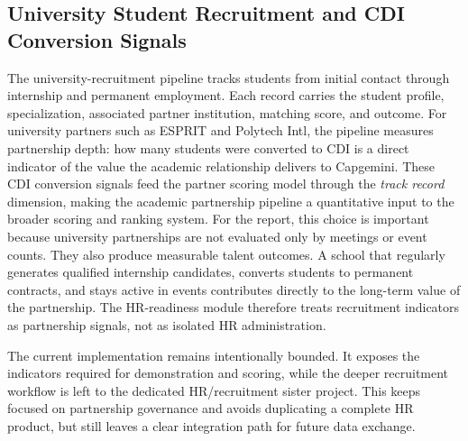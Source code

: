 \subsection{University Student Recruitment and CDI Conversion Signals}

The university-recruitment pipeline tracks students from initial contact through internship and permanent employment. Each record carries the student profile, specialization, associated partner institution, matching score, and outcome. For university partners such as ESPRIT and Polytech Intl, the pipeline measures partnership depth: how many students were converted to CDI is a direct indicator of the value the academic relationship delivers to Capgemini. These CDI conversion signals feed the partner scoring model through the \textit{track record} dimension, making the academic partnership pipeline a quantitative input to the broader scoring and ranking system.
For the report, this choice is important because university partnerships are not evaluated only by meetings or event counts. They also produce measurable talent outcomes. A school that regularly generates qualified internship candidates, converts students to permanent contracts, and stays active in events contributes directly to the long-term value of the partnership. The HR-readiness module therefore treats recruitment indicators as partnership signals, not as isolated HR administration.

The current implementation remains intentionally bounded. It exposes the indicators required for demonstration and scoring, while the deeper recruitment workflow is left to the dedicated HR/recruitment sister project. This keeps \projectname{} focused on partnership governance and avoids duplicating a complete HR product, but still leaves a clear integration path for future data exchange.
